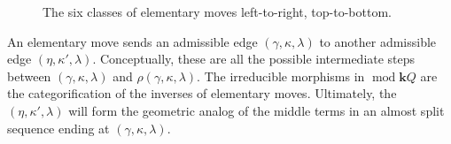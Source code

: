 \documentclass[11pt]{amsart}
\theoremstyle{plain}
\theoremstyle{definition}
\numberwithin{equation}{section}
\renewcommand{\k}{\mathbf{k}}
\renewcommand{\mod}{\operatorname{mod}}
\begin{document}
\begin{figure}[h]
    \caption{The six classes of elementary moves left-to-right, top-to-bottom.}
    \label{fig:elementary}
\end{figure}

An elementary move sends an admissible edge $( \gamma, \kappa, \lambda )$ to another admissible edge $(\eta, \kappa', \lambda)$.
Conceptually, these are all the possible intermediate steps between $(\gamma, \kappa, \lambda)$ and $\rho(\gamma, \kappa, \lambda)$.
The irreducible morphisms in $\mod \k Q$ are the categorification of the inverses of elementary moves. 
Ultimately, the $(\eta, \kappa', \lambda)$ will form the geometric analog of the middle terms in an almost split sequence ending at $( \gamma, \kappa, \lambda)$.
\end{document}
